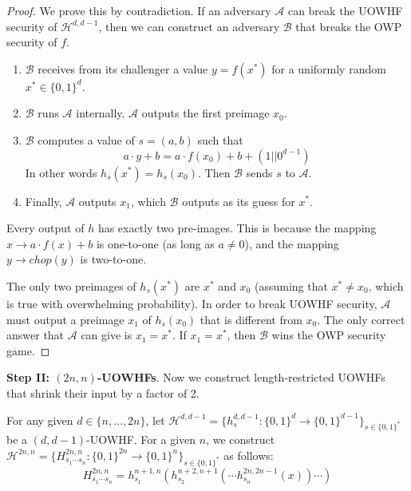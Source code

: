\documentclass[12pt]{tufte-book}
\newcommand{\cA}{\mathcal{A}}
\newcommand{\cB}{\mathcal{B}}
\newcommand{\bit}{\{0,1\}}
\begin{document}
\begin{proof}
    We prove this by contradiction. If an adversary $\mathcal{A}$ can break the UOWHF security of $\mathcal{H}^{d, d-1}$, then we can construct an adversary $\mathcal{B}$ that breaks the OWP security of $f$. 

    \begin{enumerate}
        \item $\mathcal{B}$ receives from its challenger a value $y = f(x^*)$ for a uniformly random $x^* \in \bit^d$.
        \item $\mathcal{B}$ runs $\mathcal{A}$ internally. $\cA$ outputs the first preimage $x_0$.
        \item $\mathcal{B}$ computes a value of $s=(a,b)$ such that 
        \[a \cdot y + b = a \cdot f(x_0) + b + (1 || 0^{d-1})\] 
        In other words $h_s(x^*) = h_s(x_0)$. Then $\cB$ sends $s$ to $\cA$.
        \item Finally, $\mathcal{A}$ outputs $x_1$, which $\cB$ outputs as its guess for $x^*$. 
    \end{enumerate} 

    Every output of $h$ has exactly two pre-images. This is because the mapping $x \to a \cdot f(x) + b$ is one-to-one (as long as $a \neq 0$), and the mapping $y \to chop(y)$ is two-to-one.

    The only two preimages of $h_s(x^*)$ are $x^*$ and $x_0$ (assuming that $x^* \neq x_0$, which is true with overwhelming probability). In order to break UOWHF security, $\cA$ must output a preimage $x_1$ of $h_s(x_0)$ that is different from $x_0$. The only correct answer that $\cA$ can give is $x_1 = x^*$. If $x_1 = x^*$, then $\cB$ wins the OWP security game.
\end{proof}
\vspace{5mm}

\noindent\textbf{Step II: $(2n, n)$-UOWHFs}.
Now we construct length-restricted UOWHFs that shrink their input by a factor of 2.

\begin{construction}\label{construction-2}
    For any given $d \in \{n, \dots, 2n\}$, let $\mathcal{H}^{d, d-1} = \{h_s^{d, d-1}: \bit^{d}\rightarrow\bit^{d-1}\}_{s\in\bit^{*}}$ be a $(d, d-1)$-UOWHF. For a given $n$, we construct $\mathcal{H}^{2n, n} = \{H^{2n, n}_{s_1\cdots s_n}:\bit^{2n}\rightarrow\bit^{n}\}_{s \in \bit^*}$ as follows:
    \[
        H^{2n, n}_{s_1\cdots s_n}=h_{s_1}^{n+1,n}(h_{s_2}^{n+2,n+1}(\cdots h_{s_n}^{2n,2n-1}(x))\cdots)
    \]
\end{construction}
\end{document}
